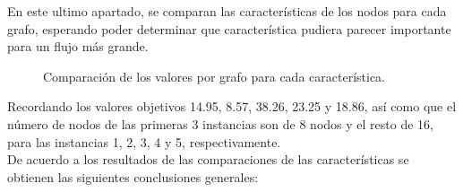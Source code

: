 \documentclass[12pt]{article}
\begin{document}
En este ultimo apartado, se comparan las características de los nodos para cada grafo, esperando poder determinar que característica pudiera parecer importante para un flujo más grande.

\begin{figure}[H]
\centering
{}

\caption{Comparación de los valores por grafo para cada característica.} \label{f12}
\end{figure}

Recordando los valores objetivos  14.95, 8.57, 38.26, 23.25 y 18.86, así como que el número de nodos de las primeras 3 instancias son de 8 nodos y el resto de 16, para las instancias 1, 2, 3, 4 y 5, respectivamente.  \\

De acuerdo a los resultados de las comparaciones de las características se obtienen las siguientes conclusiones generales:
\end{document}
